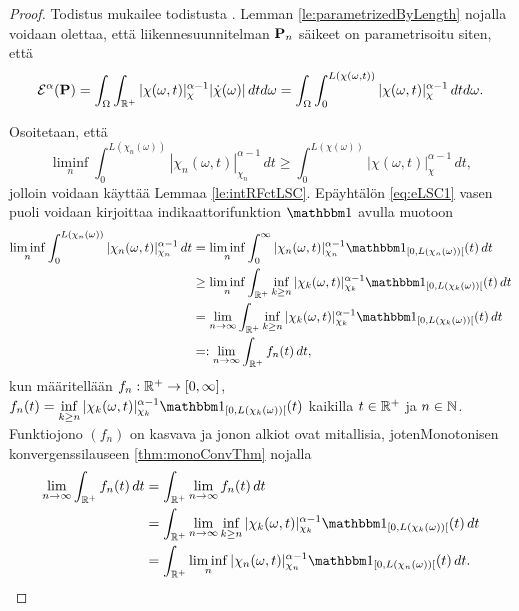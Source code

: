 \documentclass[12pt,oneside,a4paper]{amsbook} %
\begin{document}
\begin{proof}
    Todistus mukailee todistusta \cite[s. 37]{optimal}. Lemman \ref{le:parametrizedByLength} nojalla voidaan olettaa, että liikennesuunnitelman $\P_n$ säikeet on parametrisoitu siten, että 
    \begin{equation}
         \E^\alpha(\P) = \int_\Omega \int_{\R^+}|\chi(\omega, t)|^{\alpha-1}_\chi|\dot\chi(\omega)| \, dtd\omega = \int_\Omega \int_{0}^{L(\chi(\omega, t))}|\chi(\omega, t)|^{\alpha-1}_\chi \, dtd\omega.
    \end{equation}
    
    Osoitetaan, että
    \begin{equation}\label{eq:eLSC1}
      \liminf_{n} \int_0^{L(\chi_n(\omega))}|\chi_n(\omega, t)|_{\chi_n}^{\alpha-1}\, dt \ge \int_0^{L(\chi(\omega))}|\chi(\omega, t)|_{\chi}^{\alpha-1} \, dt,
    \end{equation}
    jolloin voidaan käyttää Lemmaa \ref{le:intRFctLSC}.
    Epäyhtälön \eqref{eq:eLSC1} vasen puoli voidaan kirjoittaa indikaattorifunktion $\indfct{}$ avulla muotoon
    \begin{align*}
        \liminf_{n} \int_0^{L(\chi_n(\omega))} |\chi_n(\omega, t)|_{\chi_n}^{\alpha-1} \, dt &= \liminf_{n} \int_0^\infty |\chi_n(\omega, t)|_{\chi_n}^{\alpha-1} \indfct{[0,L(\chi_n(\omega))[}(t) \, dt \\
        &\ge \liminf_n \int_\Rp \inf_{k \ge n} |\chi_k(\omega, t)|_{\chi_k}^{\alpha-1} \indfct{[0, L(\chi_k(\omega))[}(t) \, dt \\
        &=\lim_{n\to \infty} \int_\Rp \inf_{k \ge n} |\chi_k(\omega, t)|_{\chi_k}^{\alpha-1} \indfct{[0, L(\chi_k(\omega))[}(t) \, dt \\
        &=: \lim_{n \to \infty}  \int_\Rp f_n(t) \, dt,
    \end{align*}
    kun määritellään $f_n: \Rp \to [0, \infty]$, $\displaystyle f_n(t) = \inf_{k \ge n} |\chi_k(\omega, t)|_{\chi_k}^{\alpha-1} \indfct{[0, L(\chi_k(\omega))[}(t)$ kaikilla $t \in \Rp$ ja $n \in \N$. Funktiojono $(f_n)$ on kasvava ja jonon alkiot ovat mitallisia, jotenMonotonisen konvergenssilauseen \ref{thm:monoConvThm} nojalla 
    \begin{align*}
        \lim_{n \to \infty}  \int_\Rp f_n(t) \, dt &= \int_\Rp \lim_{n\to\infty}f_n(t) \, dt \\
        &= \int_\Rp \lim_{n \to \infty}  \inf_{k \ge n} |\chi_k(\omega, t)|_{\chi_k}^{\alpha-1} \indfct{[0, L(\chi_k(\omega))[}(t) \, dt \\
        &= \int_\Rp \liminf_{n} |\chi_n(\omega, t)|_{\chi_n}^{\alpha-1} \indfct{[0, L(\chi_n(\omega))[}(t) \, dt.

\end{align*}
\end{proof}
\end{document}
